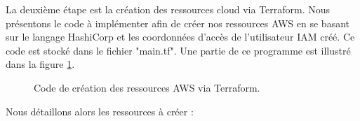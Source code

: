 La deuxième étape est la création des ressources cloud via Terraform. Nous présentons le code à implémenter afin de créer nos ressources AWS en se basant sur le langage HashiCorp et les coordonnées d'accès de l'utilisateur IAM créé. Ce code est stocké dans le fichier "main.tf". Une partie de ce programme est illustré dans la figure \ref{fig:terraform_main}.
\begin{figure}[H]
        \centering
        \caption{Code de création des ressources AWS via Terraform.}
        \label{fig:terraform_main}
\end{figure}
\vspace{2cm}
Nous détaillons alors les ressources à créer :

